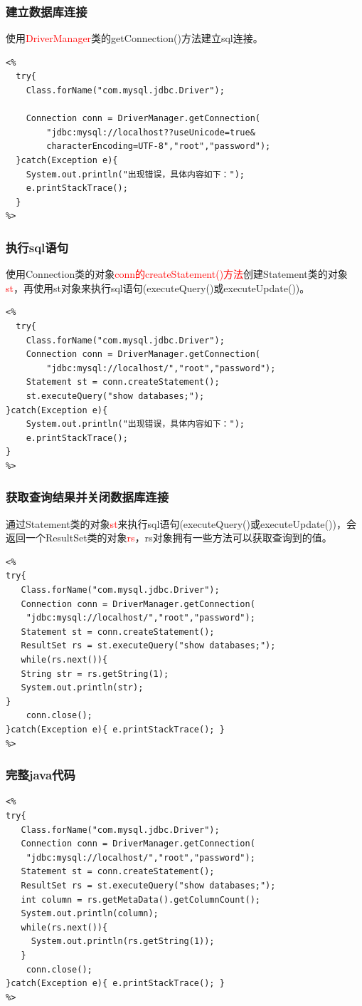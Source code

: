 \documentclass{beamer}
\begin{document}
\begin{frame}[fragile]
\frametitle{建立数据库连接}
使用\textcolor{red}{DriverManager}类的getConnection()方法建立sql连接。
\begin{lstlisting}
<%
  try{
    Class.forName("com.mysql.jdbc.Driver");
    
    Connection conn = DriverManager.getConnection(
        "jdbc:mysql://localhost??useUnicode=true&
        characterEncoding=UTF-8","root","password");
  }catch(Exception e){
    System.out.println("出现错误，具体内容如下：");
    e.printStackTrace();
  }
%>
\end{lstlisting}
\end{frame}


\begin{frame}[fragile]
\frametitle{执行sql语句}
使用Connection类的对象\textcolor{red}{conn的createStatement()方法}创建Statement类的对象\textcolor{red}{st}，再使用st对象来执行sql语句(executeQuery()或executeUpdate())。
\begin{lstlisting}
<%
  try{
    Class.forName("com.mysql.jdbc.Driver");
    Connection conn = DriverManager.getConnection(
        "jdbc:mysql://localhost/","root","password");
    Statement st = conn.createStatement();
    st.executeQuery("show databases;");
}catch(Exception e){
    System.out.println("出现错误，具体内容如下：");
    e.printStackTrace();
}
%>
\end{lstlisting}
\end{frame}


\begin{frame}[fragile]
\frametitle{获取查询结果并关闭数据库连接}
通过Statement类的对象\textcolor{red}{st}来执行sql语句(executeQuery()或executeUpdate())，会返回一个ResultSet类的对象\textcolor{red}{rs}，rs对象拥有一些方法可以获取查询到的值。
\begin{lstlisting}
<%
try{	
   Class.forName("com.mysql.jdbc.Driver");
   Connection conn = DriverManager.getConnection(
    "jdbc:mysql://localhost/","root","password");
   Statement st = conn.createStatement();
   ResultSet rs = st.executeQuery("show databases;");
   while(rs.next()){
   String str = rs.getString(1);
   System.out.println(str);
}
    conn.close();
}catch(Exception e){ e.printStackTrace(); }
%>
\end{lstlisting}
\end{frame}


\begin{frame}[fragile]
\frametitle{完整java代码}
\begin{lstlisting}
<%
try{
   Class.forName("com.mysql.jdbc.Driver");
   Connection conn = DriverManager.getConnection(
    "jdbc:mysql://localhost/","root","password");
   Statement st = conn.createStatement();
   ResultSet rs = st.executeQuery("show databases;");
   int column = rs.getMetaData().getColumnCount();
   System.out.println(column);
   while(rs.next()){
     System.out.println(rs.getString(1));
   }
    conn.close();
}catch(Exception e){ e.printStackTrace(); }
%>
\end{lstlisting}
\end{frame}
\end{document}

